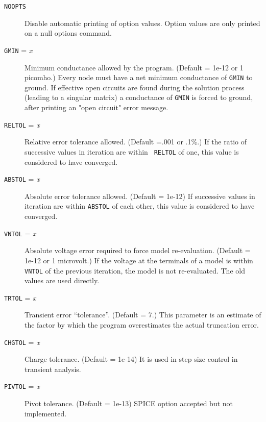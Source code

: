 \begin{description}
\item[{\tt NOOPTS}] Disable automatic printing of option values.
Option values are only printed on a null options command.

\item[{\tt GMIN} = {\it x}] Minimum conductance allowed by the program.
(Default = 1e-12 or 1 picomho.)  Every node must have a net
minimum conductance of {\tt GMIN} to ground.  If effective open
circuits are found during the solution process (leading to a
singular matrix) a conductance of {\tt GMIN} is forced to
ground, after printing an "open circuit" error message.

\item[{\tt RELTOL} = {\it x}] Relative error tolerance allowed.
(Default =.001 or .1\%.)
If the ratio of successive values in iteration are within {\tt
RELTOL} of one, this value is considered to have converged.

\item[{\tt ABSTOL} = {\it x}] Absolute error tolerance
allowed.  (Default = 1e-12)
If successive values in iteration are within {\tt ABSTOL} of
each other, this value is considered to have converged.

\item[{\tt VNTOL} = {\it x}] Absolute voltage error required to
force model re-evaluation.  (Default = 1e-12 or 1 microvolt.)
If the voltage at the terminals of a model is within {\tt
VNTOL} of the previous iteration, the model is not
re-evaluated.  The old values are used directly.

\item[{\tt TRTOL} = {\it x}] Transient error ``tolerance''.
(Default = 7.)  This parameter is an estimate of the factor by
which the program overestimates the actual truncation error.

\item[{\tt CHGTOL} = {\it x}] Charge tolerance.  (Default =
1e-14) It is used in step size control in transient analysis.

\item[{\tt PIVTOL} = {\it x}] Pivot tolerance.  (Default =
1e-13) SPICE option accepted but not implemented.


\end{description}
